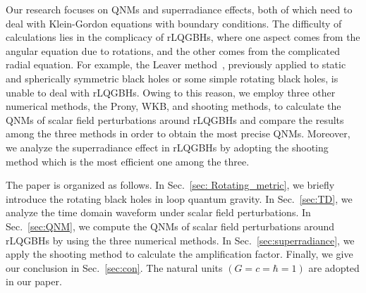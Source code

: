 \documentclass[12pt]{article}
\begin{document}

Our research focuses on QNMs and superradiance effects, both of which need to deal with Klein-Gordon equations with boundary conditions.
The difficulty of calculations lies in the complicacy of rLQGBHs, where  
one aspect comes from the angular equation due to rotations,  and the other comes from the complicated radial equation.
For example, the  Leaver method~\cite{leaver1985analytic}, previously applied to static and spherically symmetric black holes or some simple rotating black holes, is unable to deal with rLQGBHs.
Owing to this reason, we employ three other numerical methods, the Prony, WKB, and shooting methods, to calculate the QNMs of scalar field perturbations around rLQGBHs and compare the results among the three methods in order to obtain the most precise QNMs. Moreover, we analyze the superradiance effect in rLQGBHs by adopting the shooting method which is the most efficient one among the three.

The paper is organized as follows.
In Sec.~\ref{sec: Rotating_metric}, we briefly introduce the rotating black holes in loop quantum gravity.
In Sec.~\ref{sec:TD}, we analyze the time domain waveform under scalar field perturbations.
In Sec.~\ref{sec:QNM}, we compute the QNMs of scalar field perturbations around rLQGBHs by using the three numerical methods. 
In Sec.~\ref{sec:superradiance}, we apply the shooting method to calculate the amplification factor. 
Finally, we give our conclusion in Sec.~\ref{sec:con}. The natural units $(G = c = \hbar =1)$ are adopted in our paper.
\end{document}
